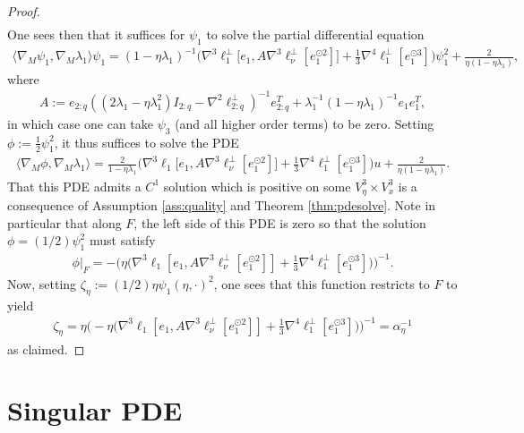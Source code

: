 \documentclass{article}
\theoremstyle{plain}
\theoremstyle{definition}
\theoremstyle{remark}
\begin{document}
\begin{proof}
\begin{align}
    \end{align}
    One sees then that it suffices for $\psi_1$ to solve the partial differential equation
    \begin{align}
        \langle\nabla_M\psi_1,\nabla_M\lambda_1\rangle\psi_1 = (1-\eta\lambda_1)^{-1}\bigg(\nabla^3\ell^{\perp}_1\big[e_1,A\nabla^3\ell^{\perp}_{\nu}[e_1^{\odot 2}]\big] + \frac{1}{3}\nabla^4\ell^{\perp}_1[e_1^{\odot 3}]\bigg)\psi_1^2 + \frac{2}{\eta(1-\eta\lambda_1)},
    \end{align}
    where
    \begin{align}
    A:=e_{2:q}((2\lambda_1-\eta\lambda_1^2)I_{2:q}-\nabla^2\ell^{\perp}_{2:q})^{-1}e_{2:q}^T + \lambda_1^{-1}(1-\eta\lambda_1)^{-1}e_1e_1^T,
    \end{align}
    in which case one can take $\psi_3$ (and all higher order terms) to be zero. Setting $\phi:=\frac{1}{2}\psi_1^2$, it thus suffices to solve the PDE
    \begin{align}
        \langle\nabla_M\phi,\nabla_M\lambda_1\rangle = \frac{2}{1-\eta\lambda_1}\bigg(\nabla^3\ell_1\big[e_1,A\nabla^3\ell^{\perp}_{\nu}[e_1^{\odot 2}]\big] + \frac{1}{3}\nabla^4\ell^{\perp}_1[e_1^{\odot 3}]\bigg)u + \frac{2}{\eta(1-\eta\lambda_1)}.
    \end{align}
    That this PDE admits a $C^1$ solution which is positive on some $V^3_{\eta}\times V^3_x$ is a consequence of Assumption \ref{ass:quality} and Theorem \ref{thm:pdesolve}. Note in particular that along $F$, the left side of this PDE is zero so that the solution $\phi = (1/2)\psi_1^2$ must satisfy
    \begin{align}
    \phi|_F = -\bigg(\eta\bigg(\nabla^3\ell_1[e_1,A\nabla^3\ell^{\perp}_{\nu}[e_1^{\odot 2}]] + \frac{1}{3}\nabla^4\ell_1^{\perp}[e_1^{\odot 3}]\bigg)\bigg)^{-1}.
    \end{align}
    Now, setting $\zeta_{\eta}:=(1/2)\eta\psi_1(\eta,\cdot)^2$, one sees that this function restricts to $F$ to yield
    \begin{align}
    \zeta_{\eta} =\eta\bigg(-\eta \bigg(\nabla^3\ell_1[e_1,A\nabla^3\ell^{\perp}_{\nu}[e_1^{\odot 2}]] + \frac{1}{3}\nabla^4\ell_1^{\perp}[e_1^{\odot 3}]\bigg)\bigg)^{-1} = \alpha_{\eta}^{-1}
    \end{align}
    as claimed.
\end{proof}

\section{Singular PDE}\label{sec:singularpde}
\end{document}
